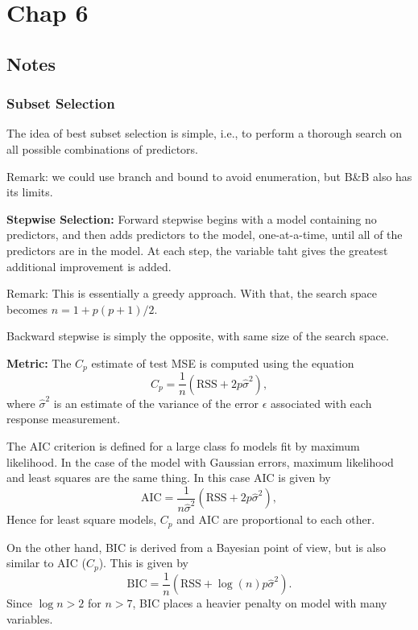 \section{Chap 6}
\subsection{Notes}
\subsubsection{Subset Selection}
The idea of best subset selection is simple, i.e., to perform a thorough search on all possible combinations of predictors.
\begin{tbox}
Remark: we could use branch and bound to avoid enumeration, but B\&B also has its limits.
\end{tbox}
\textbf{Stepwise Selection:}
Forward stepwise begins with a model containing no predictors, and then adds predictors to the model, one-at-a-time, until all of the predictors are in the model. At each step, the variable taht gives the greatest additional improvement is added.
\begin{tbox}
	Remark: This is essentially a greedy approach. With that, the search space becomes $n = 1 + p(p+1)/2$.
\end{tbox}
Backward stepwise is simply the opposite, with same size of the search space.

\textbf{Metric:}
The $C_p$ estimate of test MSE is computed using the equation $$ C_p = \frac{1}{n}(\text{RSS} +2p\hat{\sigma}^2),$$ where $\hat{\sigma}^2$ is an estimate of the variance of the error $\epsilon$ associated with each response measurement. 

The AIC criterion is defined for a large class fo models fit by maximum likelihood. In the case of the model with Gaussian errors, maximum likelihood and least squares are the same thing. In this case AIC is given by $$\text{AIC} = \frac{1}{n\hat{\sigma}^2}(\text{RSS}+2p\hat{\sigma}^2),$$ Hence for least square models, $C_p$ and AIC are proportional to each other.

On the other hand, BIC is derived from a Bayesian point of view, but is also similar to AIC ($C_p$). This is given by $$ \text{BIC} =\frac{1}{n}(\text{RSS}+\log(n)p\hat{\sigma}^2).$$ Since $\log n >2 $ for $n>7$, BIC places a heavier penalty on model with many variables.


